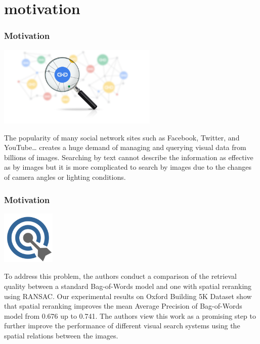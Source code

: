 \section{motivation}

\begin{frame}[fragile]
    \frametitle{Motivation}

    \begin{center}
        \includegraphics[width=3.0in]{images/relevancy.png}
    \end{center}

    The popularity of many social network sites such as Facebook, Twitter, and YouTube… creates a huge demand of managing and querying visual data from billions of images. Searching by text cannot describe the information as effective as by images but it is more complicated to search by images due to the changes of camera angles or lighting conditions. 

\end{frame}

\begin{frame}[fragile]
    \frametitle{Motivation}

    \begin{center}
        \includegraphics[width=1.0in]{images/target.png}
    \end{center}

    To address this problem, the authors conduct a comparison of the retrieval quality between a standard Bag-of-Words model and one with spatial reranking using RANSAC. 
    Our experimental results on Oxford Building 5K Dataset show that spatial reranking improves the mean Average Precision of Bag-of-Words model from 0.676 up to 0.741. The authors view this work as a promising step to further improve the performance of different visual search systems using the spatial relations between the images.
\end{frame}
